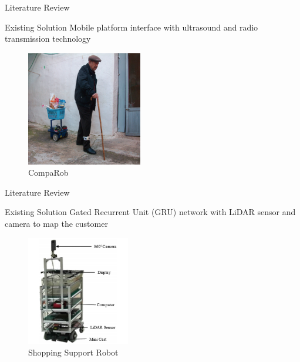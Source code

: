 \documentclass{beamer}
\begin{document}
\begin{frame}{Literature Review}
  \begin{block}{Existing Solution}
        Mobile platform interface with ultrasound and radio transmission technology~\cite{Sales2016-CompaRob}
  \end{block}
    \begin{figure}[b]
        \centering
        \includegraphics[width=0.45\textwidth]{figs/img/CompaRob}
        \caption{CompaRob}
    \end{figure}
\end{frame}


\begin{frame}{Literature Review}
  \begin{block}{Existing Solution}
        Gated Recurrent Unit (GRU) network with LiDAR sensor and camera to map the customer~\cite{islam_lam_fukuda_kobayashi_kuno_2019}
  \end{block}
    \begin{figure}[b]
        \centering
        \includegraphics[width=0.40\textwidth]{figs/img/ShoppingSuportRobot}
        \caption{Shopping Support Robot}
    \end{figure}
\end{frame}
\end{document}
